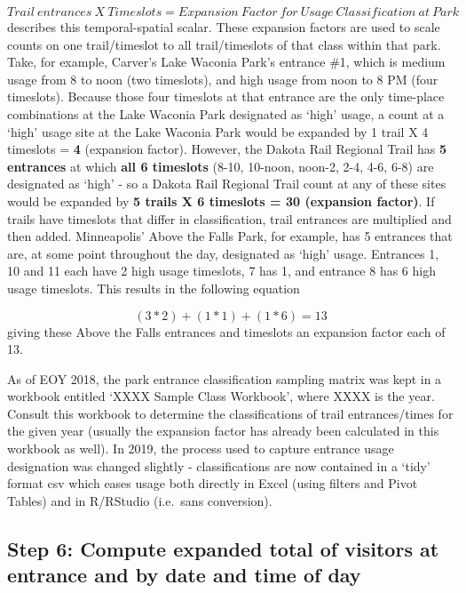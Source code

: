 \documentclass[]{article}
\begin{document}
\[ Trail\:entrances\:X\:Timeslots = Expansion\:Factor\:for\:Usage\:Classification\:at\:Park \]
describes this temporal-spatial scalar. These expansion factors are used
to scale counts on one trail/timeslot to all trail/timeslots of that
class within that park. Take, for example, Carver's Lake Waconia Park's
entrance \#1, which is medium usage from 8 to noon (two timeslots), and
high usage from noon to 8 PM (four timeslots). Because those four
timeslots at that entrance are the only time-place combinations at the
Lake Waconia Park designated as `high' usage, a count at a `high' usage
site at the Lake Waconia Park would be expanded by 1 trail X 4 timeslots
= \textbf{4} (expansion factor). However, the Dakota Rail Regional Trail
has \textbf{5 entrances} at which \textbf{all 6 timeslots} (8-10,
10-noon, noon-2, 2-4, 4-6, 6-8) are designated as `high' - so a Dakota
Rail Regional Trail count at any of these sites would be expanded by
\textbf{5 trails X 6 timeslots = 30 (expansion factor)}. If trails have
timeslots that differ in classification, trail entrances are multiplied
and then added. Minneapolis' Above the Falls Park, for example, has 5
entrances that are, at some point throughout the day, designated as
`high' usage. Entrances 1, 10 and 11 each have 2 high usage timeslots, 7
has 1, and entrance 8 has 6 high usage timeslots. This results in the
following equation

\[ (3*2)+(1*1)+(1*6) = 13 \] giving these Above the Falls entrances and
timeslots an expansion factor each of 13.

As of EOY 2018, the park entrance classification sampling matrix was
kept in a workbook entitled `XXXX Sample Class Workbook', where XXXX is
the year. Consult this workbook to determine the classifications of
trail entrances/times for the given year (usually the expansion factor
has already been calculated in this workbook as well). In 2019, the
process used to capture entrance usage designation was changed slightly
- classifications are now contained in a `tidy' format csv which eases
usage both directly in Excel (using filters and Pivot Tables) and in
R/RStudio (i.e.~sans conversion).

\subsection{Step 6: Compute expanded total of visitors at entrance and
by date and time of
day}\label{step-6-compute-expanded-total-of-visitors-at-entrance-and-by-date-and-time-of-day}
\end{document}
